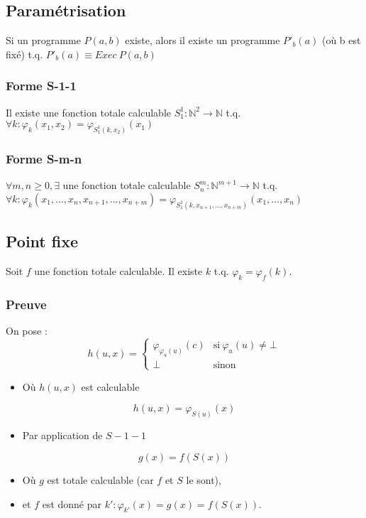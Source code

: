 \subsection{Paramétrisation}

Si un programme $P(a,b)$ existe, alors il existe un programme $P'_b(a)$ (où b est fixé) t.q. $P'_b(a) \equiv Exec \ P(a,b)$

\subsubsection{Forme S-1-1}

Il existe une fonction totale calculable $S^1_1 : \mathbb{N}^2 \rightarrow \mathbb{N}$ t.q. $\forall k : \varphi_k(x_1, x_2) = \varphi_{S^1_1(k,x_2)}(x_1)$

\subsubsection{Forme S-m-n}

$\forall m,n \geq 0, \exists$ une fonction totale calculable $S^m_n : \mathbb{N}^{m+1} \rightarrow \mathbb{N}$ t.q. $\forall k : \varphi_k(x_1, \ldots, x_n, x_{n+1}, \ldots, x_{n+m}) = \varphi_{S^1_1(k,x_{n+1}, \ldots, x_{n+m})}(x_1, \ldots, x_n)$

\subsection{Point fixe}

Soit $f$ une fonction totale calculable. Il existe $k$ t.q. $\varphi_k = \varphi_f(k)$.

\subsubsection{Preuve}

On pose :
\begin{equation}\label{eq:pf1}
h(u,x) =
\begin{cases}
	\varphi_{\varphi_u(u)}(c) & \text{si}\ \varphi_u(u) \neq \bot\\
	\bot & \text{sinon}
\end{cases}
\end{equation}
\begin{itemize}
\item[] Où $h(u,x)$ est calculable
\end{itemize}
\begin{equation}\label{eq:pf2}
h(u,x) = \varphi_{S(u)}(x)
\end{equation}
\begin{itemize}
\item[] Par application de $S-1-1$
\end{itemize}
\begin{equation}\label{eq:pf3}
g(x) = f(S(x))
\end{equation}
\begin{itemize}
\item[] Où $g$ est totale calculable (car $f$ et $S$ le sont),
\item[] et $f$ est donné par $k' : \varphi_{k'}(x) = g(x) = f(S(x))$.
\end{itemize}

